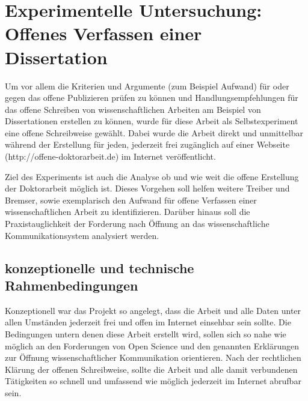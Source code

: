 \chapter{Experimentelle Untersuchung: Offenes Verfassen einer Dissertation}

Um vor allem die Kriterien und Argumente (zum Beispiel Aufwand) für oder gegen das offene Publizieren prüfen zu können und Handlungsempfehlungen für das offene Schreiben von wissenschaftlichen Arbeiten am Beispiel von Dissertationen erstellen zu können, wurde für diese Arbeit als Selbstexperiment eine offene Schreibweise gewählt. Dabei wurde die Arbeit direkt und unmittelbar während der Erstellung für jeden, jederzeit frei zugänglich auf einer Webseite (http://offene-doktorarbeit.de) im Internet veröffentlicht.

Ziel des Experiments ist auch die Analyse ob und wie weit die offene Erstellung der Doktorarbeit möglich ist. Dieses Vorgehen soll helfen weitere Treiber und Bremser, sowie exemplarisch den Aufwand für offene Verfassen einer wissenschaftlichen Arbeit zu identifizieren. Darüber hinaus soll die Praxistauglichkeit der Forderung nach Öffnung an das wissenschaftliche Kommunikationsystem analysiert werden.

\section{konzeptionelle und technische Rahmenbedingungen}

Konzeptionell war das Projekt so angelegt, dass die Arbeit und alle Daten unter allen Umständen jederzeit frei und offen im Internet einsehbar sein sollte. Die Bedingungen untern denen diese Arbeit erstellt wird, sollen sich so nahe wie möglich an den Forderungen von Open Science und den genannten Erklärungen zur Öffnung wissenschaftlicher Kommunikation orientieren. Nach der rechtlichen Klärung der offenen Schreibweise, sollte die Arbeit und alle damit verbundenen Tätigkeiten so schnell und umfassend wie möglich jederzeit im Internet abrufbar sein.

